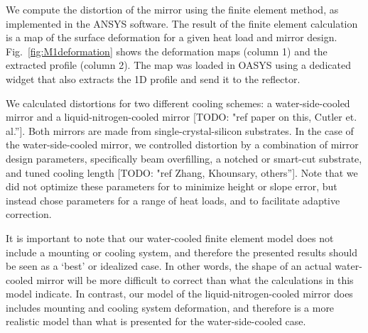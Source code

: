 \documentclass[]{spie}  %
\newcommand{\todo}[1]{{\color{red}[TODO: "#1'']}}
\begin{document}
We compute the distortion of the mirror using the finite element method, as implemented in the ANSYS software. The result of the finite element calculation is a map of the surface deformation for a given heat load and mirror design. Fig.~\ref{fig:M1deformation} shows the deformation maps (column 1) and the extracted profile (column 2). The map was loaded in OASYS using a dedicated widget that also extracts the 1D profile and send it to the reflector.

We calculated distortions for two different cooling schemes: a water-side-cooled mirror and a liquid-nitrogen-cooled mirror \todo{ref paper on this, Cutler et. al.}. Both mirrors are made from single-crystal-silicon substrates. In the case of the water-side-cooled mirror, we controlled distortion by a combination of mirror design parameters, specifically beam overfilling, a notched or smart-cut substrate, and tuned cooling length \todo{ref Zhang, Khounsary, others}.  Note that we did not optimize these parameters for to minimize height or slope error, but instead chose parameters for a range of heat loads, and to facilitate adaptive correction.

It is important to note that our water-cooled finite element model does not include a mounting or cooling system, and therefore the presented results should be seen as a `best' or idealized case.  In other words, the shape of an actual water-cooled mirror will be more difficult to correct than what the calculations in this model indicate. In contrast, our model of the liquid-nitrogen-cooled mirror does includes mounting and cooling system deformation, and therefore is a more realistic model than what is presented for the water-side-cooled case.
\end{document}
